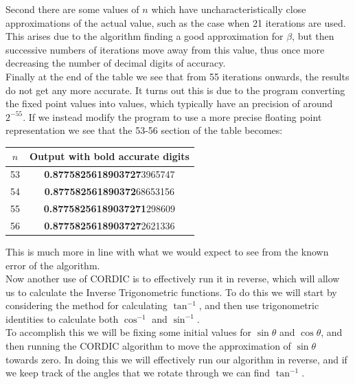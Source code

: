 {Second there are some values of \(n\) which have uncharacteristically close approximations of the actual value, such as the case when 21 iterations are used. This arises due to the algorithm finding a good approximation for \(\beta\), but then successive numbers of iterations move away from this value, thus once more decreasing the number of decimal digits of accuracy.\\

Finally at the end of the table we see that from 55 iterations onwards, the results do not get any more accurate. It turns out this is due to the program converting the  fixed point values into  values, which typically have an precision of around \(2^{-55}\). If we instead modify the program to use a more precise floating point representation we see that the 53-56 section of the table becomes:

{\selectfont
\begin{center}
\begin{tabular}{|c|c|}
	\hline
	\(n\) & \textsf{Output with bold accurate digits}\\\hline
	53 & \textbf{0.8775825618903727}3965747\\\hline
	54 & \textbf{0.877582561890372}68653156\\\hline
	55 & \textbf{0.87758256189037271}298609\\\hline
	56 & \textbf{0.8775825618903727}2621336\\\hline
\end{tabular}
\end{center}}

This is much more in line with what we would expect to see from the known error of the algorithm.\\

Now another use of CORDIC is to effectively run it in reverse, which will allow us to calculate the Inverse Trigonometric functions. To do this we will start by considering the method for calculating \(\tan^{-1}\), and then use trigonometric identities to calculate both \(\cos^{-1}\) and \(\sin^{-1}\).\\

To accomplish this we will be fixing some initial values for \(\sin\theta\) and \(\cos\theta\), and then running the CORDIC algorithm to move the approximation of \(\sin\theta\) towards zero. In doing this we will effectively run our algorithm in reverse, and if we keep track of the angles that we rotate through we can find \(\tan^{-1}\).\\

}
